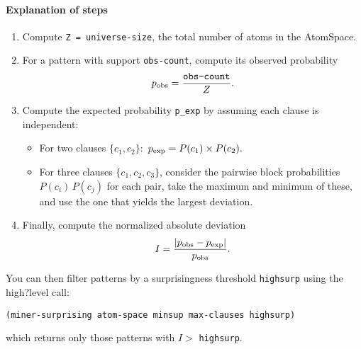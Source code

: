 \documentclass{article}
\begin{document}
\paragraph{Explanation of steps}

\begin{enumerate}
  \item Compute \texttt{Z = universe-size}, the total number of atoms in the AtomSpace.
  \item For a pattern with support \texttt{obs-count}, compute its observed probability
        \[
          p_{\rm obs} = \frac{\texttt{obs-count}}{Z}.
        \]
  \item Compute the expected probability \texttt{p\_exp} by assuming each clause is independent:
  \begin{itemize}
    \item For two clauses \(\{c_1,c_2\}\):
      \(\,p_{\rm exp} = P(c_1)\times P(c_2).\)
    \item For three clauses \(\{c_1,c_2,c_3\}\), consider the pairwise block probabilities
      \(P(c_i)\,P(c_j)\) for each pair, take the maximum and minimum of these, and use the one that yields the largest deviation.
  \end{itemize}
  \item Finally, compute the normalized absolute deviation
        \[
          I = \frac{\lvert p_{\rm obs} - p_{\rm exp}\rvert}{p_{\rm obs}}.
        \]
\end{enumerate}

You can then filter patterns by a surprisingness threshold \texttt{highsurp} using the high?level call:
\begin{verbatim}
(miner-surprising atom-space minsup max-clauses highsurp)
\end{verbatim}
which returns only those patterns with \(I >\) \texttt{highsurp}.
\end{document}
